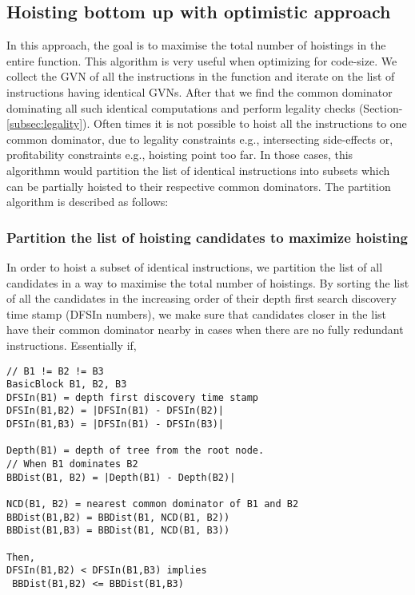\documentclass{sig-alternate}
\begin{document}
\subsection{Hoisting bottom up with optimistic approach}
\label{subsec:optimistic}
In this approach, the goal is to maximise the total number of hoistings in the
entire function.  This algorithm is very useful when optimizing for code-size.
We collect the GVN of all the instructions in the function and iterate on the
list of instructions having identical GVNs. After that we find the common
dominator dominating all such identical computations and perform legality checks
(Section-\ref{subsec:legality}). Often times it is not possible to hoist all the
instructions to one common dominator, due to legality constraints e.g.,
intersecting side-effects or, profitability constraints e.g., hoisting point too
far. In those cases, this algorithmn would partition the list of identical
instructions into subsets which can be partially hoisted to their respective
common dominators. The partition algorithm is described as follows:

\subsubsection{Partition the list of hoisting candidates to maximize hoisting}
\label{subsec:partition}
In order to hoist a subset of identical instructions, we partition the list of
all candidates in a way to maximise the total number of hoistings.  By sorting
the list of all the candidates in the increasing order of their depth first
search discovery time stamp \cite{clrs} (DFSIn numbers), we make sure that
candidates closer in the list have their common dominator nearby in cases when
there are no fully redundant instructions. Essentially if,

\begin{verbatim}
// B1 != B2 != B3
BasicBlock B1, B2, B3
DFSIn(B1) = depth first discovery time stamp
DFSIn(B1,B2) = |DFSIn(B1) - DFSIn(B2)|
DFSIn(B1,B3) = |DFSIn(B1) - DFSIn(B3)|

Depth(B1) = depth of tree from the root node.
// When B1 dominates B2
BBDist(B1, B2) = |Depth(B1) - Depth(B2)|

NCD(B1, B2) = nearest common dominator of B1 and B2
BBDist(B1,B2) = BBDist(B1, NCD(B1, B2))
BBDist(B1,B3) = BBDist(B1, NCD(B1, B3))

Then,
DFSIn(B1,B2) < DFSIn(B1,B3) implies
 BBDist(B1,B2) <= BBDist(B1,B3)
\end{verbatim}
\end{document}
